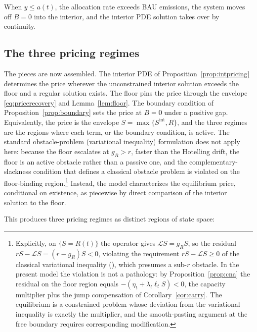 \documentclass[11pt,letterpaper]{article}
\theoremstyle{plain}
\theoremstyle{definition}
\numberwithin{equation}{section}
\begin{document}
When $y\le a(t)$, the allocation rate exceeds BAU emissions, the system moves off $B=0$ into the interior, and the interior PDE solution takes over by continuity.

\subsection{The three pricing regimes}\label{sec:regimes}

The pieces are now assembled. The interior PDE of Proposition~\ref{prop:intpricing} determines the price wherever the unconstrained interior solution exceeds the floor and a regular solution exists. The floor pins the price through the envelope \eqref{eq:pricerecovery} and Lemma~\ref{lem:floor}. The boundary condition of Proposition~\ref{prop:boundary} sets the price at $B=0$ under a positive gap. Equivalently, the price is the envelope $S=\max\{S^{\mathrm{int}},R\}$, and the three regimes are the regions where each term, or the boundary condition, is active. The standard obstacle-problem (variational inequality) formulation does not apply here: because the floor escalates at $g_R>r$, faster than the Hotelling drift, the floor is an active obstacle rather than a passive one, and the complementary-slackness condition that defines a classical obstacle problem is violated on the floor-binding region.\footnote{Explicitly, on $\{S=R(t)\}$ the operator gives $\mathcal{L}S = g_R S$, so the residual $rS-\mathcal{L}S=(r-g_R)S<0$, violating the requirement $rS-\mathcal{L}S\ge 0$ of the classical variational inequality (\citet{bensoussan1982}), which presumes a sub-$r$ obstacle. In the present model the violation is not a pathology: by Proposition~\ref{prop:cna} the residual on the floor region equals $-(\eta_t+\lambda_t\ell_tS)<0$, the capacity multiplier plus the jump compensation of Corollary~\ref{cor:carry}. The equilibrium is a constrained problem whose deviation from the variational inequality is exactly the multiplier, and the smooth-pasting argument at the free boundary requires corresponding modification.}
Instead, the model characterizes the equilibrium price, conditional on existence, as piecewise by direct comparison of the interior solution to the floor.

This produces three pricing regimes as distinct regions of state space:
\end{document}
